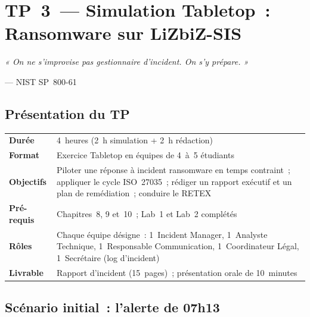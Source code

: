 
\chapter{TP~3~— Simulation Tabletop~: Ransomware sur LiZbiZ-SIS}
\label{lab:tabletop}

\epigraph{\itshape « On ne s'improvise pas gestionnaire d'incident.
  On s'y prépare. »}
         {--- NIST SP~800-61}

\section*{Présentation du TP}

\begin{table}[H]
\centering\small
{}
\begin{tabular}{p{3.5cm}p{10cm}}
\toprule
\textbf{Durée} & 4~heures (2~h simulation + 2~h rédaction) \\
\textbf{Format} & Exercice Tabletop en équipes de 4~à~5 étudiants \\
\textbf{Objectifs} & Piloter une réponse à incident ransomware en temps
  contraint~; appliquer le cycle ISO~27035~; rédiger un rapport exécutif
  et un plan de remédiation~; conduire le RETEX \\
\textbf{Pré-requis} & Chapitres~8, 9 et~10~; Lab~1 et Lab~2 complétés \\
\textbf{Rôles} & Chaque équipe désigne~: 1~Incident Manager,
  1~Analyste Technique, 1~Responsable Communication,
  1~Coordinateur Légal, 1~Secrétaire (log d'incident) \\
\textbf{Livrable} & Rapport d'incident (15~pages)~; présentation
  orale de 10~minutes \\
\bottomrule
\end{tabular}
\end{table}


\section{Scénario initial~: l'alerte de 07h13}
\label{lab3:scenario-initial}

